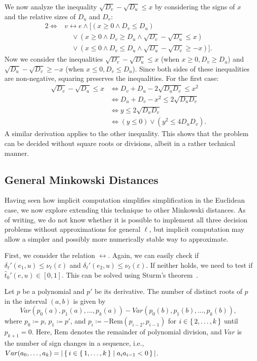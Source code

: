 We now analyze the inequality \(\sqrt{D_v} - \sqrt{D_u} \leq x\) by considering the signs of \(x\) and the relative sizes of \(D_u\) and \(D_v\):
\begin{alignat*}{2}
  \iff& v \leftrightarrow e \land \big[ (x \geq 0 \land D_v \leq D_u) \\
  & \quad \lor (x \geq 0 \land D_v \geq D_u \land \sqrt{D_v} - \sqrt{D_u} \leq x ) \\
  & \quad \lor (x \leq 0 \land D_v \leq D_u \land \sqrt{D_u} - \sqrt{D_v} \geq -x ) \big].
\end{alignat*}
Now we consider the inequalities \(\sqrt{D_v} - \sqrt{D_u} \leq x\) (when \(x \geq 0, D_v \geq D_u\)) and \(\sqrt{D_u} - \sqrt{D_v} \geq -x\) (when \(x \leq 0, D_v \leq D_u\)). Since both sides of these inequalities are non-negative, squaring preserves the inequalities. For the first case:
\begin{align*}
  \sqrt{D_v} - \sqrt{D_u} \leq x &\iff D_v + D_u - 2\sqrt{D_uD_v} \leq x^2 \\
   &\iff D_u + D_v - x^2 \leq 2\sqrt{D_uD_v} \\
   &\iff y \leq 2\sqrt{D_uD_v} \\
   &\iff (y \leq 0) \lor (y^2 \leq 4D_uD_v).
\end{align*}
A similar derivation applies to the other inequality. This shows that the problem can be decided without square roots or divisions, albeit in a rather technical manner.

\subsection{General Minkowski Distances}
Having seen how implicit computation simplifies simplification in the Euclidean case, we now explore extending this technique to other Minkowski distances. As of writing, we do not know whether it is possible to implement all three decision problems without approximations for general \(\ell\), but implicit computation may allow a simpler and possibly more numerically stable way to approximate.

First, we consider the relation \(\leftrightarrow\). Again, we can easily check if \(\delta_\ell'(e_1, u) \leq \nu_\ell(\varepsilon)\) and \(\delta_\ell'(e_2, u) \leq \nu_\ell(\varepsilon)\). If neither holds, we need to test if \(\hat t_0'(e, u) \in [0,1]\). This can be solved using Sturm's theorem~\cite{algorithms_in_real_algebraic_geometry}.
\begin{theorem}
  Let \(p\) be a polynomial and \(p'\) be its derivative. The number of distinct roots of \(p\) in the interval \((a,b)\) is given by
  \[Var(p_0(a), p_1(a), \dots, p_k(a)) - Var(p_0(b), p_1(b), \dots, p_k(b)),\]
	where \(p_0 \coloneq p\), \(p_1 \coloneq p'\), and \(p_i \coloneq -\text{Rem}(p_{i-2}, p_{i-1})\) for \(i \in \set{2, \dots, k}\) until \(p_{k+1} = 0\).
	Here, \(\text{Rem}\) denotes the remainder of polynomial division, and \(Var\) is the number of sign changes in a sequence, i.e., \(Var(a_0,\dots, a_k) = |\set{i \in \set{1, \dots, k} \mid a_i a_{i-1} < 0}|\).
\end{theorem}

